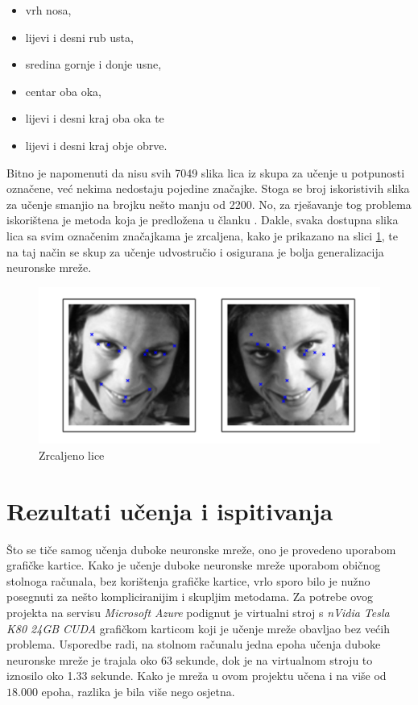 \documentclass[times, utf8, zavrsni, numeric]{fer}
\begin{document}
\begin{itemize}
    \item vrh nosa, 
    \item lijevi i desni rub usta, 
    \item sredina gornje i donje usne, 
    \item centar oba oka,
    \item lijevi i desni kraj oba oka te 
    \item lijevi i desni kraj obje obrve.
\end{itemize}

Bitno je napomenuti da nisu svih 7049 slika lica iz skupa za učenje u potpunosti označene, već nekima nedostaju pojedine značajke. Stoga se broj iskoristivih slika za učenje smanjio na brojku nešto manju od 2200. No, za rješavanje tog problema iskorištena je metoda koja je predložena u članku \citep{daniel}. Dakle, svaka dostupna slika lica sa svim označenim značajkama je zrcaljena, kako je prikazano na slici \ref{fig:flip}, te na taj način se skup za učenje udvostručio i osigurana je bolja generalizacija neuronske mreže.

\begin{figure}[htb]
    \centering
    \includegraphics[width=12cm]{images/face_flip.png}
    \caption{Zrcaljeno lice}
    \label{fig:flip}
\end{figure}

\section{Rezultati učenja i ispitivanja}

Što se tiče samog učenja duboke neuronske mreže, ono je provedeno uporabom grafičke kartice. Kako je učenje duboke neuronske mreže uporabom običnog stolnoga računala, bez korištenja grafičke kartice, vrlo sporo bilo je nužno posegnuti za nešto kompliciranijim i skupljim metodama. Za potrebe ovog projekta na servisu \emph{Microsoft Azure} podignut je virtualni stroj s \emph{nVidia Tesla K80 24GB CUDA} grafičkom karticom koji je učenje mreže obavljao bez većih problema. Usporedbe radi, na stolnom računalu jedna epoha učenja duboke neuronske mreže je trajala oko 63 sekunde, dok je na virtualnom stroju to iznosilo oko 1.33 sekunde. Kako je mreža u ovom projektu učena i na više od $18.000$ epoha, razlika je bila više nego osjetna.
\end{document}
